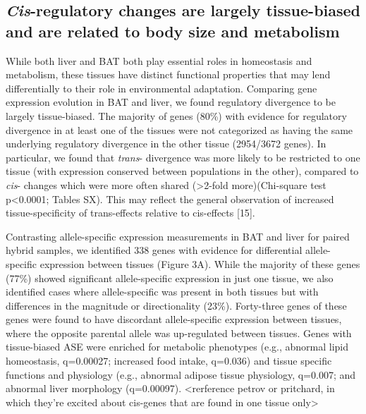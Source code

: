 \documentclass[9pt,twocolumn,twoside,lineno]{pnas-new}
\begin{document}
\hypertarget{cis-regulatory-changes-are-largely-tissue-biased-and-are-related-to-body-size-and-metabolism}{%
\subsection*{\texorpdfstring{\emph{Cis}-regulatory changes are largely
tissue-biased and are related to body size and
metabolism}{Cis-regulatory changes are largely tissue-biased and are related to body size and metabolism}}\label{cis-regulatory-changes-are-largely-tissue-biased-and-are-related-to-body-size-and-metabolism}}

While both liver and BAT both play essential roles in homeostasis and
metabolism, these tissues have distinct functional properties that may
lend differentially to their role in environmental adaptation. Comparing
gene expression evolution in BAT and liver, we found regulatory
divergence to be largely tissue-biased. The majority of genes (80\%)
with evidence for regulatory divergence in at least one of the tissues
were not categorized as having the same underlying regulatory divergence
in the other tissue (2954/3672 genes). In particular, we found that
\emph{trans}- divergence was more likely to be restricted to one tissue
(with expression conserved between populations in the other), compared
to \emph{cis}- changes which were more often shared (\textgreater2-fold
more)(Chi-square test p\textless0.0001; Tables SX). This may reflect the
general observation of increased tissue-specificity of trans-effects
relative to cis-effects {[}15{]}.

Contrasting allele-specific expression measurements in BAT and liver for
paired hybrid samples, we identified 338 genes with evidence for
differential allele-specific expression between tissues (Figure 3A).
While the majority of these genes (77\%) showed significant
allele-specific expression in just one tissue, we also identified cases
where allele-specific was present in both tissues but with differences
in the magnitude or directionality (23\%). Forty-three genes of these
genes were found to have discordant allele-specific expression between
tissues, where the opposite parental allele was up-regulated between
tissues. Genes with tissue-biased ASE were enriched for metabolic
phenotypes (e.g., abnormal lipid homeostasis, q=0.00027; increased food
intake, q=0.036) and tissue specific functions and physiology (e.g.,
abnormal adipose tissue physiology, q=0.007; and abnormal liver
morphology (q=0.00097). \textless rerference petrov or pritchard, in
which they're excited about cis-genes that are found in one tissue
only\textgreater{}
\end{document}
